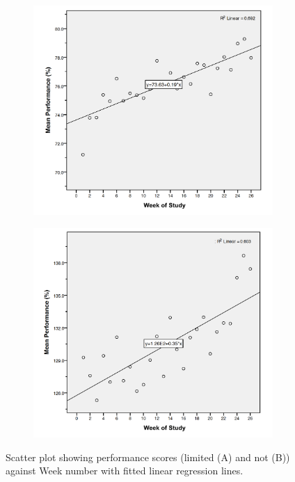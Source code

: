 \begin{figure}[h]
    \centering
    \begin{subfigure}[t]{0.48\textwidth}
        \centering
        \includegraphics[width=\textwidth]{Files/prevention-study-3/figures/performance-linear-limit}
        \caption{}
        \label{fig: performance-linear-limit}
    \end{subfigure}
    \hfill
    \begin{subfigure}[t]{0.48\textwidth}
        \centering
        \includegraphics[width=\textwidth]{Files/prevention-study-3/figures/performance-linear-nolimit}
        \caption{}
        \label{fig: performance-linear-nolimit}
    \end{subfigure}
    \caption{Scatter plot showing performance scores (limited (A) and not (B)) against Week number with fitted linear regression lines.}
    \label{fig: performance-linear-limitcomparison}
\end{figure}

